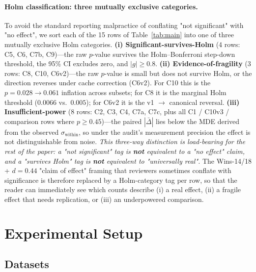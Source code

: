 \documentclass[11pt]{article}
\theoremstyle{definition}
\begin{document}
\paragraph{Holm classification: three mutually exclusive categories.}
To avoid the standard reporting malpractice of conflating "not significant" with "no effect", we sort each of the 15 rows of Table~\ref{tab:main} into one of three mutually exclusive Holm categories. \textbf{(i) Significant-survives-Holm} (4 rows: C5, C6, C7b, C9)---the raw $p$-value survives the Holm--Bonferroni step-down threshold, the 95\% CI excludes zero, and $|g| \geq 0.8$. \textbf{(ii) Evidence-of-fragility} (3 rows: C8, C10, C6v2)---the raw $p$-value is small but does not survive Holm, or the direction reverses under cache correction (C6v2). For C10 this is the $p = 0.028 \to 0.061$ inflation across subsets; for C8 it is the marginal Holm threshold ($0.0066$ vs.\ $0.005$); for C6v2 it is the v1 $\to$ canonical reversal. \textbf{(iii) Insufficient-power} (8 rows: C2, C3, C4, C7a, C7c, plus all C1 / C10v3 / comparison rows where $p \geq 0.45$)---the paired $|\bar{\Delta}|$ lies below the MDE derived from the observed $\sigma_{\text{within}}$, so under the audit's measurement precision the effect is not distinguishable from noise. \emph{This three-way distinction is load-bearing for the rest of the paper: a "not significant" tag is \textbf{not} equivalent to a "no effect" claim, and a "survives Holm" tag is \textbf{not} equivalent to "universally real".} The Wins-14/18 + $d = 0.44$ "claim of effect" framing that reviewers sometimes conflate with significance is therefore replaced by a Holm-category tag per row, so that the reader can immediately see which counts describe (i) a real effect, (ii) a fragile effect that needs replication, or (iii) an underpowered comparison.

\section{Experimental Setup}
\label{sec:setup}

\subsection{Datasets}
\end{document}
